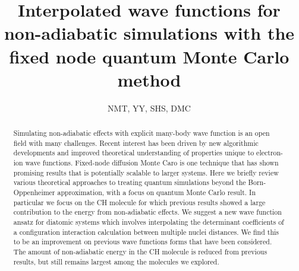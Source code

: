 \documentclass[aip,jcp,numerical,reprint]{revtex4-1}
\begin{document}
\title{Interpolated wave functions for non-adiabatic simulations with the fixed node quantum Monte Carlo method}
\author{NMT, YY, SHS, DMC}

\begin{abstract}
Simulating non-adiabatic effects with explicit many-body wave function is an open field with many challenges.  %
 Recent interest has been driven by new algorithmic developments and improved theoretical understanding of properties unique to electron-ion wave functions.  Fixed-node diffusion Monte Caro is one technique that has shown promising results that is potentially scalable to larger systems.
 Here we briefly review various theoretical approaches to  treating quantum simulations beyond the Born-Oppenheimer approximation, with a focus on quantum Monte Carlo result.  In particular we focus on the CH molecule for which previous results showed a large contribution to the energy from non-adiabatic effects.  We suggest a new wave function ansatz for diatomic systems which involves interpolating the determinant coefficients of a configuration interaction calculation between multiple nuclei distances.   We find this to be an improvement on previous wave functions forms that have been considered.    The amount of non-adiabatic energy in the CH molecule is reduced from previous results, but still remains largest among the molecules we explored.

\end{abstract}
\maketitle
\end{document}

